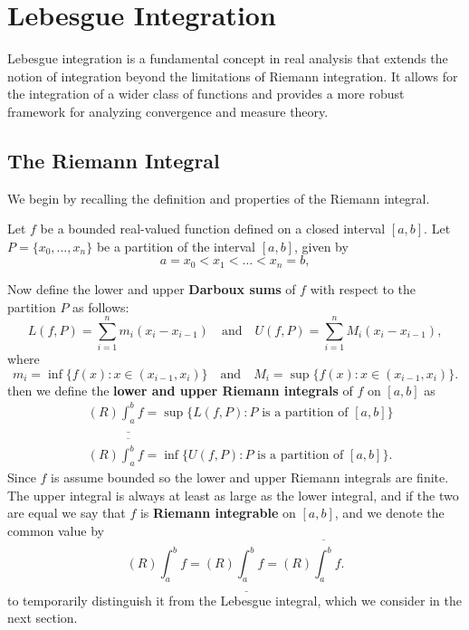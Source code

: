 \documentclass[../main.tex]{subfiles}
\begin{document}
\chapter{Lebesgue Integration}

Lebesgue integration is a fundamental concept in real analysis that extends the notion of integration beyond the limitations of Riemann integration. It allows for the integration of a wider class of functions and provides a more robust framework for analyzing convergence and measure theory.

\section{The Riemann Integral}
We begin by recalling the definition and properties of the Riemann integral.

Let $f$ be a bounded real-valued function defined on a closed interval $[a, b]$. Let $P = \{ x_0, \ldots , x_n \}$ be a partition of the interval $[a, b]$, given by
\begin{equation*}
	a = x_0 < x_1 < \ldots < x_n = b,
\end{equation*}

Now define the lower and upper \textbf{Darboux sums} of $f$ with respect to the partition $P$ as follows:
\begin{equation}
	L(f, P) = \sum_{i=1}^{n} m_i (x_i - x_{i-1}) \quad \text{and} \quad U(f, P) = \sum_{i=1}^{n} M_i (x_i - x_{i-1}),
\end{equation}
where
\begin{equation}
	m_i = \inf \{ f(x) : x \in (x_{i-1}, x_i) \} \quad \text{and} \quad M_i = \sup \{ f(x) : x \in (x_{i-1}, x_i) \}.
\end{equation}
then we define the \textbf{lower and upper Riemann integrals} of $f$ on $[a, b]$ as
\begin{equation}
	\begin{aligned}
		 & (R) \underline{\int_a^b} f = \sup \{ L(f, P) : P \text{ is a partition of } [a, b] \} \\
		 & (R) \overline{\int_a^b} f = \inf \{ U(f, P) : P \text{ is a partition of } [a, b] \}.
	\end{aligned}
\end{equation}
Since $f$ is assume bounded so the lower and upper Riemann integrals are finite. The upper integral is always at least as large as the lower integral, and if the two are equal we say that $f$ is \textbf{Riemann integrable} on $[a, b]$, and we denote the common value by
\begin{equation}
	(R) \int_a^b f = (R) \underline{\int_a^b} f = (R) \overline{\int_a^b} f.
\end{equation}
to temporarily distinguish it from the Lebesgue integral, which we consider in the next section.
\end{document}
